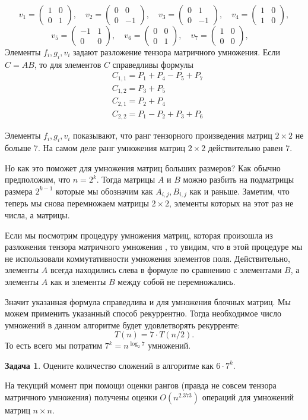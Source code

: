 \documentclass[10pt,a4paper,oneside]{book}
\theoremstyle{definition}
\newtheorem{zad}{\color{violet!100!black}Задача}
\def\zd{\begin{zad}}
\def\ezd{\end{zad}}
\def\pmat{\begin{pmatrix}}
\def\epmat{\end{pmatrix}}
\begin{document}
$$
v_1= \pmat 1 & 0 \\ 0 & 1 \epmat,  \quad
v_2=\pmat 0& 0\\0 & -1\epmat,  \quad
v_3=\pmat 0 & 1 \\ 0 & -1 \epmat,  \quad
v_4=\pmat 1& 0\\1 & 0 \epmat,  
$$
$$
v_5=\pmat -1& 1\\ 0& 0\epmat,  \quad
v_6=\pmat 0&0 \\0 & 1\epmat,  \quad
v_7=\pmat 1& 0\\ 0& 0\epmat,  \quad
$$
Элементы $f_i,g_i,v_i$ задают разложение тензора матричного умножения. Если $C=AB$, то для элементов $C$ справедливы формулы
$$ 
\begin{aligned}
&C_{1,1}=P_1+P_4-P_5+P_7\\
&C_{1,2}=P_3+P_5\\
&C_{2,1}=P_2+P_4\\
&C_{2,2}=P_1-P_2+P_3+P_6
\end{aligned}
$$

Элементы $f_i,g_i,v_i$ показывают, что ранг тензорного произведения матриц $2\times 2$ не больше $7$. На самом деле ранг умножения матриц $2\times 2$ действительно равен $7$.

Но как это поможет для умножения матриц больших размеров? Как обычно предположим, что $n=2^k$. Тогда матрицы $A$ и $B$ можно разбить на подматрицы размера $2^{k-1}$ которые мы обозначим как $A_{i,j}, B_{i,j}$ как и раньше. Заметим, что теперь мы снова перемножаем матрицы $2\times 2$, элементы которых на этот раз не числа, а матрицы. 

Если мы посмотрим процедуру умножения матриц, которая произошла из разложения тензора матричного умножения , то увидим, что в этой процедуре мы не использовали коммутативности умножения элементов поля. Действительно, элементы $A$ всегда находились слева в формуле по сравнению с элементами $B$, а элементы $A$ как и элементы $B$ между собой не перемножались.

Значит указанная формула справедлива и для умножения блочных матриц. Мы можем применить указанный способ рекуррентно. Тогда необходимое  число умножений в данном алгоритме будет удовлетворять рекурренте:
$$T(n)=7\cdot T(n/2).$$
То есть всего мы потратим $7^{k}=n^{\log_2 7}$ умножений.

\zd Оцените количество сложений в алгоритме как $6\cdot 7^k$.
\ezd

На текущий момент при помощи оценки рангов (правда не совсем тензора матричного умножения) получены оценки $O(n^{2.373})$ операций для умножений матриц $n\times n$.
\end{document}
